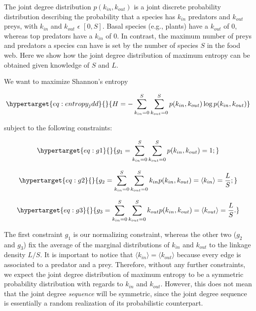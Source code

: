 \documentclass[10pt,oneside]{article}
\begin{document}
The joint degree distribution \(p(k_{in},k_{out})\) is a joint discrete
probability distribution describing the probability that a species has
\(k_{in}\) predators and \(k_{out}\) preys, with \(k_{in}\) and
\(k_{out}\) \(\epsilon\) \([0, S]\). Basal species (e.g., plants) have a
\(k_{out}\) of \(0\), whereas top predators have a \(k_{in}\) of \(0\).
In contrast, the maximum number of preys and predators a species can
have is set by the number of species \(S\) in the food web. Here we show
how the joint degree distribution of maximum entropy can be obtained
given knowledge of \(S\) and \(L\).

We want to maximize Shannon's entropy

\begin{equation}\protect\hypertarget{eq:entropy_jdd}{}{H = -\sum_{k_{in}=0}^S\sum_{k_{out}=0}^S p(k_{in},k_{out}) \log p(k_{in},k_{out})}\label{eq:entropy_jdd}\end{equation}

subject to the following constraints:

\begin{equation}\protect\hypertarget{eq:g1}{}{g_1 = \sum_{k_{in}=0}^S\sum_{k_{out}=0}^S p(k_{in},k_{out}) = 1;}\label{eq:g1}\end{equation}

\begin{equation}\protect\hypertarget{eq:g2}{}{g_2 = \sum_{k_{in}=0}^S\sum_{k_{out}=0}^S k_{in} p(k_{in},k_{out}) = \langle k_{in} \rangle = \frac{L}{S};}\label{eq:g2}\end{equation}

\begin{equation}\protect\hypertarget{eq:g3}{}{g_3 = \sum_{k_{in}=0}^S\sum_{k_{out}=0}^S k_{out} p(k_{in},k_{out}) = \langle k_{out} \rangle = \frac{L}{S}.}\label{eq:g3}\end{equation}

The first constraint \(g_1\) is our normalizing constraint, whereas the
other two (\(g_2\) and \(g_3\)) fix the average of the marginal
distributions of \(k_{in}\) and \(k_{out}\) to the linkage density
\(L/S\). It is important to notice that
\(\langle k_{in} \rangle = \langle k_{out} \rangle\) because every edge
is associated to a predator and a prey. Therefore, without any further
constraints, we expect the joint degree distribution of maximum entropy
to be a symmetric probability distribution with regards to \(k_{in}\)
and \(k_{out}\). However, this does not mean that the joint degree
\emph{sequence} will be symmetric, since the joint degree sequence is
essentially a random realization of its probabilistic counterpart.
\end{document}
